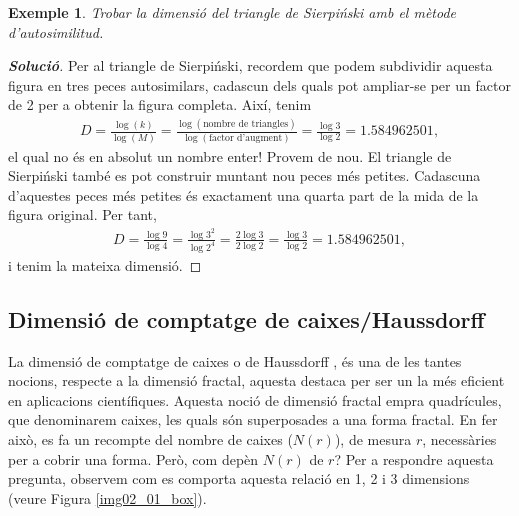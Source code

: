 \documentclass[12pt,a4paper]{report}
\newtheorem{eje}{Exemple}[chapter]
\newcommand*{\myproofname}{\textbf{Solució}}
\newenvironment{myproof}[1][\myproofname]{\begin{proof}[#1]\renewcommand*{\qedsymbol}{\(\blacksquare\)}}{\end{proof}}
\begin{document}
\begin{eje}
\label{eje03_dim_auto}
Trobar la dimensió del triangle de Sierpiński amb el mètode d'autosimilitud.
\end{eje}
\begin{myproof}
Per al triangle de Sierpiński, recordem que podem subdividir aquesta figura en tres peces autosimilars, cadascun dels quals pot ampliar-se per un factor de 2 per a obtenir la figura completa. Així, tenim
\begin{align*}
D = \frac{\log(k)}{\log(M)} = \frac{\log(\text{nombre de triangles})}{\log(\text{factor d'augment})}=\frac{\log 3}{\log 2}=1.584962501,
\end{align*}
el qual no és en absolut un nombre enter! Provem de nou. El triangle de Sierpiński també es pot construir muntant nou peces més petites. Cadascuna d'aquestes peces més petites és exactament una quarta part de la mida de la figura original. Per tant,
\begin{align*}
D = \frac{\log 9}{\log 4} = \frac{\log 3^2}{\log 2^4} = \frac{2\log 3}{2\log 2}=\frac{\log 3}{\log 2}=1.584962501,
\end{align*}
i tenim la mateixa dimensió.
\end{myproof}
\subsection{Dimensió de comptatge de caixes/Haussdorff}
La dimensió de comptatge de caixes o de Haussdorff \cite[p.~93]{KitchenScience}, és una de les tantes nocions, respecte a la dimensió fractal, aquesta destaca per ser un la més eficient en aplicacions científiques. Aquesta noció de dimensió fractal empra quadrícules, que denominarem caixes, les quals són superposades a una forma fractal. En fer això, es fa un recompte del nombre de caixes ($N(r)$), de mesura $r$, necessàries per a cobrir una forma. Però, com depèn $N(r)$ de $r$? Per a respondre aquesta pregunta, observem com es comporta aquesta relació en 1, 2 i 3 dimensions (veure Figura \ref{img02_01_box}).
\end{document}
